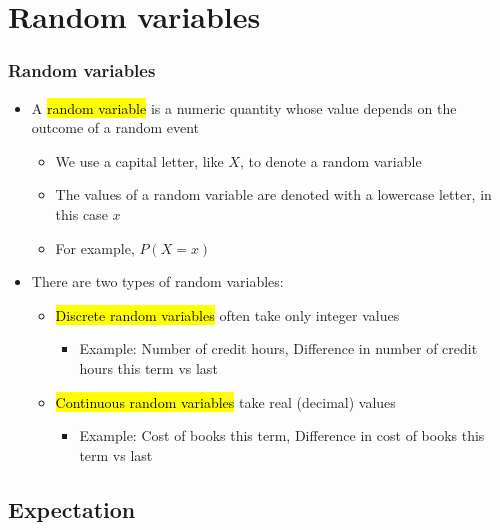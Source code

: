 
\section{Random variables}


\begin{frame}
\frametitle{Random variables}

\begin{itemize}

\item A \hl{random variable} is a numeric quantity whose value depends on the outcome of a random event
\begin{itemize}
\item We use a capital letter, like $X$, to denote a random variable
\item The values of a random variable are denoted with a lowercase letter, in this case $x$
\item For example, $P(X = x)$
\end{itemize}

\item There are two types of random variables:
\begin{itemize}
\item \hl{Discrete random variables} often take only integer values
\begin{itemize}
\item Example: Number of credit hours, Difference in number of credit hours this term vs last
\end{itemize}
\item \hl{Continuous random variables} take real (decimal) values
\begin{itemize}
\item Example: Cost of books this term, Difference in cost of books this term vs last
\end{itemize}
\end{itemize}

\end{itemize}

\end{frame}


\subsection{Expectation}

